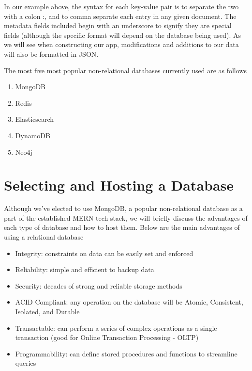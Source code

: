In our example above, the syntax for each key-value pair is to separate the two with a colon :, and to comma separate each entry in any given document. The metadata fields included begin with an underscore to signify they are special fields (although the specific format will depend on the database being used). As we will see when constructing our app, modifications and additions to our data will also be formatted in JSON.

The most five most popular non-relational databases currently used are as follows

\begin{enumerate}
    \item MongoDB
    \item Redis 
    \item Elasticsearch
    \item DynamoDB
    \item Neo4j
\end{enumerate}

\section{Selecting and Hosting a Database}

Although we've elected to use MongoDB, a popular non-relational database as a part of the established MERN tech stack, we will briefly discuss the advantages of each type of database and how to host them. Below are the main advantages of using a relational database

\begin{itemize}
    \item Integrity: constraints on data can be easily set and enforced
    \item Reliability: simple and efficient to backup data
    \item Security: decades of strong and reliable storage methods
    \item ACID Compliant: any operation on the database will be Atomic, Consistent, Isolated, and Durable
    \item Transactable: can perform a series of complex operations as a single transaction (good for Online Transaction Processing  - OLTP)
    \item Programmability: can define stored procedures and functions to streamline queries 
\end{itemize}


